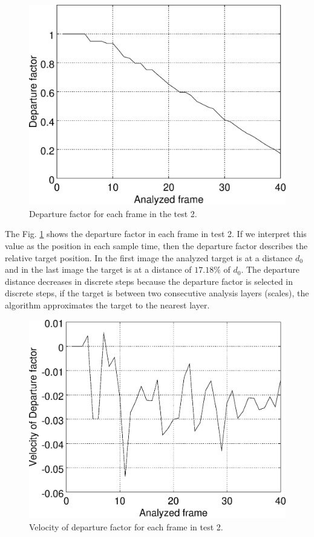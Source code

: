 \begin{figure}[H]
\includegraphics[width=\columnwidth]{images/grapha_b.eps}
\caption{Departure factor for each frame in the test 2.}
\label{fig:res_grapha_b}
\end{figure}

The Fig. \ref{fig:res_grapha_b} shows the departure factor in each frame
in test 2. If we interpret this value as the position in each sample time, 
then the departure factor describes the relative target position.
In the first image the analyzed target is at a distance $d_0$ 
and in the last image the target is at a distance of $17.18\%$ of $d_0$.
The departure distance decreases in discrete steps because the departure
factor is selected in discrete steps, if the target is
between two consecutive analysis layers (scales), the algorithm
approximates the target to the nearest layer.

\begin{figure}[!hbt]
\includegraphics[width=\columnwidth]{images/graphvelocity.eps}
\caption{Velocity of departure factor for each frame in test 2.}
\label{fig:res_grapha_bv}
\end{figure}

